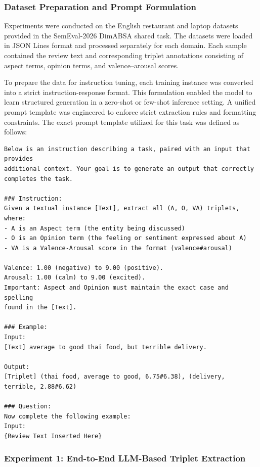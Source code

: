 \documentclass{article}
\begin{document}
\subsubsection{Dataset Preparation and Prompt Formulation}

Experiments were conducted on the English restaurant and laptop datasets provided in the SemEval-2026 DimABSA shared task. The datasets were loaded in JSON Lines format and processed separately for each domain. Each sample contained the review text and corresponding triplet annotations consisting of aspect terms, opinion terms, and valence–arousal scores.

To prepare the data for instruction tuning, each training instance was converted into a strict instruction-response format. This formulation enabled the model to learn structured generation in a zero-shot or few-shot inference setting. A unified prompt template was engineered to enforce strict extraction rules and formatting constraints. The exact prompt template utilized for this task was defined as follows:

\begin{verbatim}
Below is an instruction describing a task, paired with an input that provides 
additional context. Your goal is to generate an output that correctly 
completes the task.

### Instruction:
Given a textual instance [Text], extract all (A, O, VA) triplets, where:
- A is an Aspect term (the entity being discussed)
- O is an Opinion term (the feeling or sentiment expressed about A)
- VA is a Valence-Arousal score in the format (valence#arousal)

Valence: 1.00 (negative) to 9.00 (positive).
Arousal: 1.00 (calm) to 9.00 (excited).
Important: Aspect and Opinion must maintain the exact case and spelling 
found in the [Text].

### Example:
Input:
[Text] average to good thai food, but terrible delivery.

Output:
[Triplet] (thai food, average to good, 6.75#6.38), (delivery, terrible, 2.88#6.62)

### Question:
Now complete the following example:
Input:
{Review Text Inserted Here}
\end{verbatim}

\subsubsection{Experiment 1: End-to-End LLM-Based Triplet Extraction}
\end{document}
